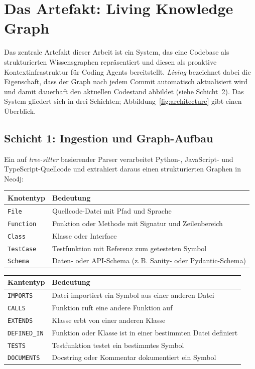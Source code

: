\section{Das Artefakt: Living Knowledge Graph}

Das zentrale Artefakt dieser Arbeit ist ein System, das eine Codebase als strukturierten Wissensgraphen repräsentiert und diesen als proaktive Kontextinfrastruktur für Coding Agents bereitstellt. \emph{Living} bezeichnet dabei die Eigenschaft, dass der Graph nach jedem Commit automatisch aktualisiert wird und damit dauerhaft den aktuellen Codestand abbildet (siehe Schicht~2). Das System gliedert sich in drei Schichten; Abbildung~\ref{fig:architecture} gibt einen Überblick.



\subsection*{Schicht 1: Ingestion und Graph-Aufbau}

Ein auf \emph{tree-sitter} basierender Parser verarbeitet Python-, JavaScript- und TypeScript-Quellcode und extrahiert daraus einen strukturierten Graphen in Neo4j:

\begin{tabularx}{\linewidth}{@{}lX@{}}
  \toprule
  \textbf{Knotentyp} & \textbf{Bedeutung} \\
  \midrule
  \texttt{File}      & Quellcode-Datei mit Pfad und Sprache \\
  \texttt{Function}  & Funktion oder Methode mit Signatur und Zeilenbereich \\
  \texttt{Class}     & Klasse oder Interface \\
  \texttt{TestCase}  & Testfunktion mit Referenz zum getesteten Symbol \\
  \texttt{Schema}    & Daten- oder API-Schema (z.\,B. Sanity- oder Pydantic-Schema) \\
  \bottomrule
\end{tabularx}

\vspace{0.5em}

\begin{tabularx}{\linewidth}{@{}lX@{}}
  \toprule
  \textbf{Kantentyp} & \textbf{Bedeutung} \\
  \midrule
  \texttt{IMPORTS}   & Datei importiert ein Symbol aus einer anderen Datei \\
  \texttt{CALLS}     & Funktion ruft eine andere Funktion auf \\
  \texttt{EXTENDS}    & Klasse erbt von einer anderen Klasse \\
  \texttt{DEFINED\_IN} & Funktion oder Klasse ist in einer bestimmten Datei definiert \\
  \texttt{TESTS}     & Testfunktion testet ein bestimmtes Symbol \\
  \texttt{DOCUMENTS} & Docstring oder Kommentar dokumentiert ein Symbol \\
  \bottomrule
\end{tabularx}

